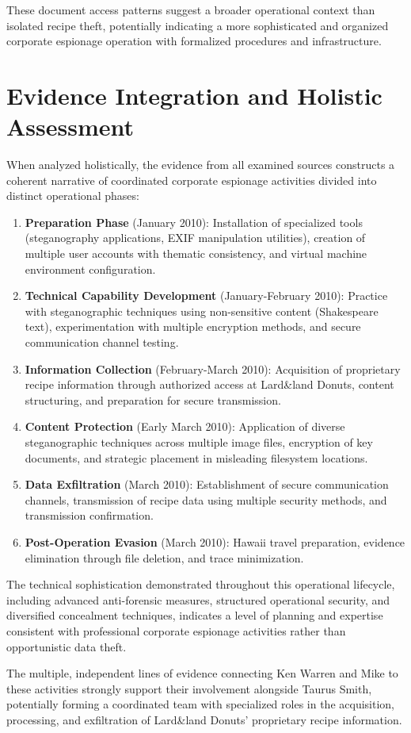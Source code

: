 These document access patterns suggest a broader operational context than isolated recipe theft, potentially indicating a more sophisticated and organized corporate espionage operation with formalized procedures and infrastructure.

\section{Evidence Integration and Holistic Assessment}
When analyzed holistically, the evidence from all examined sources constructs a coherent narrative of coordinated corporate espionage activities divided into distinct operational phases:

\begin{enumerate}
    \item \textbf{Preparation Phase} (January 2010): Installation of specialized tools (steganography applications, EXIF manipulation utilities), creation of multiple user accounts with thematic consistency, and virtual machine environment configuration.
    
    \item \textbf{Technical Capability Development} (January-February 2010): Practice with steganographic techniques using non-sensitive content (Shakespeare text), experimentation with multiple encryption methods, and secure communication channel testing.
    
    \item \textbf{Information Collection} (February-March 2010): Acquisition of proprietary recipe information through authorized access at Lard\&land Donuts, content structuring, and preparation for secure transmission.
    
    \item \textbf{Content Protection} (Early March 2010): Application of diverse steganographic techniques across multiple image files, encryption of key documents, and strategic placement in misleading filesystem locations.
    
    \item \textbf{Data Exfiltration} (March 2010): Establishment of secure communication channels, transmission of recipe data using multiple security methods, and transmission confirmation.
    
    \item \textbf{Post-Operation Evasion} (March 2010): Hawaii travel preparation, evidence elimination through file deletion, and trace minimization.
\end{enumerate}

The technical sophistication demonstrated throughout this operational lifecycle, including advanced anti-forensic measures, structured operational security, and diversified concealment techniques, indicates a level of planning and expertise consistent with professional corporate espionage activities rather than opportunistic data theft.

The multiple, independent lines of evidence connecting Ken Warren and Mike to these activities strongly support their involvement alongside Taurus Smith, potentially forming a coordinated team with specialized roles in the acquisition, processing, and exfiltration of Lard\&land Donuts' proprietary recipe information.